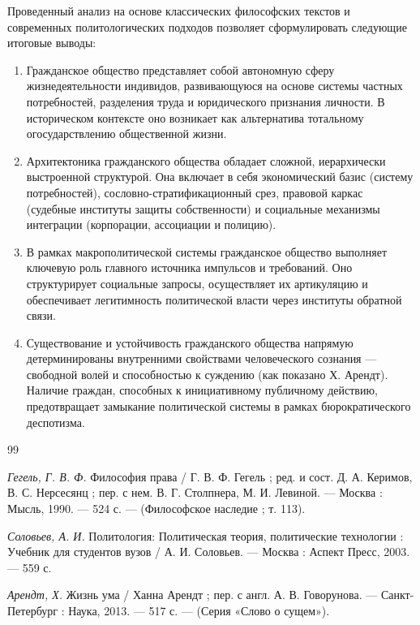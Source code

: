 \documentclass[a4paper, 14pt]{extarticle}
\begin{document}
Проведенный анализ на основе классических философских текстов и современных политологических подходов позволяет сформулировать следующие итоговые выводы:

\begin{enumerate}
    \item Гражданское общество представляет собой автономную сферу жизнедеятельности индивидов, развивающуюся на основе системы частных потребностей, разделения труда и юридического признания личности. В историческом контексте оно возникает как альтернатива тотальному огосударствлению общественной жизни.
    \item Архитектоника гражданского общества обладает сложной, иерархически выстроенной структурой. Она включает в себя экономический базис (систему потребностей), сословно-стратификационный срез, правовой каркас (судебные институты защиты собственности) и социальные механизмы интеграции (корпорации, ассоциации и полицию).
    \item В рамках макрополитической системы гражданское общество выполняет ключевую роль главного источника импульсов и требований. Оно структурирует социальные запросы, осуществляет их артикуляцию и обеспечивает легитимность политической власти через институты обратной связи.
    \item Существование и устойчивость гражданского общества напрямую детерминированы внутренними свойствами человеческого сознания --- свободной волей и способностью к суждению (как показано Х. Арендт). Наличие граждан, способных к инициативному публичному действию, предотвращает замыкание политической системы в рамках бюрократического деспотизма.
\end{enumerate}

\newpage

\begin{thebibliography}{99}

\textit{Гегель, Г. В. Ф.} Философия права / Г. В. Ф. Гегель ; ред. и сост. Д. А. Керимов, В. С. Нерсесянц ; пер. с нем. В. Г. Столпнера, М. И. Левиной. --- Москва : Мысль, 1990. --- 524 с. --- (Философское наследие ; т. 113).

\textit{Соловьев, А. И.} Политология: Политическая теория, политические технологии : Учебник для студентов вузов / А. И. Соловьев. --- Москва : Аспект Пресс, 2003. --- 559 с.

\textit{Арендт, Х.} Жизнь ума / Ханна Арендт ; пер. с англ. А. В. Говорунова. --- Санкт-Петербург : Наука, 2013. --- 517 с. --- (Серия «Слово о сущем»).

\end{thebibliography}
\end{document}
